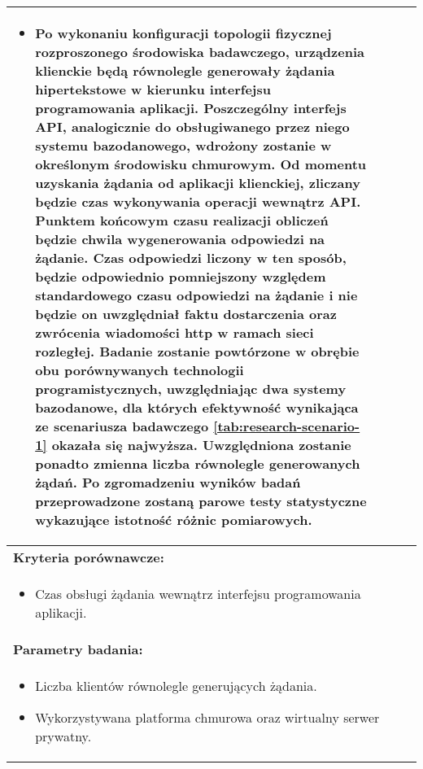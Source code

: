 \begin{longtable}[c]{|llll|}
{\begin{itemize}[label={}]
            \item Po wykonaniu konfiguracji topologii fizycznej rozproszonego środowiska badawczego, urządzenia klienckie będą równolegle generowały żądania hipertekstowe w kierunku interfejsu programowania aplikacji. Poszczególny interfejs API, analogicznie do obsługiwanego przez niego systemu bazodanowego, wdrożony zostanie w określonym środowisku chmurowym. Od momentu uzyskania żądania od aplikacji klienckiej, zliczany będzie czas wykonywania operacji wewnątrz API. Punktem końcowym czasu realizacji obliczeń będzie chwila wygenerowania odpowiedzi na żądanie. Czas odpowiedzi liczony w ten sposób, będzie odpowiednio pomniejszony względem standardowego czasu odpowiedzi na żądanie i nie będzie on uwzględniał faktu dostarczenia oraz zwrócenia wiadomości http w ramach sieci rozległej. Badanie zostanie powtórzone w obrębie obu porównywanych technologii programistycznych, uwzględniając dwa systemy bazodanowe, dla których efektywność wynikająca ze scenariusza badawczego \ref{tab:research-scenario-1} okazała się najwyższa. Uwzględniona zostanie ponadto zmienna liczba równolegle generowanych żądań. Po zgromadzeniu wyników badań przeprowadzone zostaną parowe testy statystyczne wykazujące istotność różnic pomiarowych.
          \end{itemize}
    }                                                           \\ \hline
    \multicolumn{4}{|l|}{\textbf{Kryteria porównawcze:}}                             \\ \hline
    \multicolumn{4}{|p{\linewidth}|}{
        \begin{itemize}
            \item Czas obsługi żądania wewnątrz interfejsu programowania aplikacji.
        \end{itemize}
    }                                                           \\ \hline
    \multicolumn{4}{|l|}{\textbf{Parametry badania:}}                                \\ \hline
    \multicolumn{4}{|p{\linewidth}|}{
        \begin{itemize}
            \item Liczba klientów równolegle generujących żądania.
            \item Wykorzystywana platforma chmurowa oraz wirtualny serwer prywatny.
        \end{itemize}
    }                                                           \\ \hline
\end{longtable}